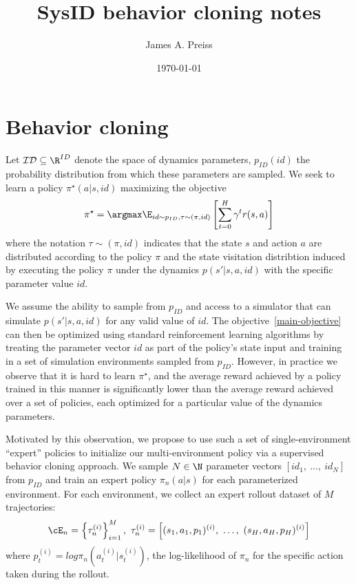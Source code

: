 \documentclass[12pt]{article}
\title{SysID behavior cloning notes}
\author{James A. Preiss}
\date{\monthyear \today}
\newcommand{\cID}{\mathcal{ID}}
\newcommand{\pibar}{\overline{\pi_\theta}}
\begin{document}
\section{Behavior cloning}
Let $\cID \subseteq \R^{ID}$ denote the space of dynamics parameters,
$p_{ID}(id)$ the probability distribution from which these parameters are sampled.
We seek to learn a policy $\pi^\star(a|s,id)$ maximizing the objective
\begin{equation}
\pi^\star = \argmax \E_{id \sim p_{ID}, \tau \sim (\pi, id)} \left[
\sum_{t=0}^H \gamma^t r(s,a)
\right]
\label{main-objective}
\end{equation}
where the notation $\tau \sim (\pi, id)$ indicates that the state $s$ and action $a$
are distributed according to the policy $\pi$ and the state visitation distribtion
induced by executing the policy $\pi$ under the dynamics $p(s'|s,a,id)$ with the specific parameter value $id$.

We assume the ability to sample from $p_{ID}$
and access to a simulator that can simulate $p(s'|s,a,id)$ for any valid value of $id$.
The objective~\eqref{main-objective} can then be optimized using standard reinforcement learning algorithms
by treating the parameter vector $id$ as part of the policy's state input
and training in a set of simulation environments sampled from $p_{ID}$.
However, in practice we observe that it is hard to learn $\pi^\star$,
and the average reward achieved by a policy trained in this manner
is significantly lower than the average reward achieved
over a set of policies, each optimized for a particular value of the dynamics parameters.

Motivated by this observation, we propose to use such a set of single-environment ``expert'' policies
to initialize our multi-environment policy via a supervised behavior cloning approach.
We sample $N \in \N$ parameter vectors $[id_1,\ \dots,\ id_N]$ from $p_{ID}$
and train an expert policy $\pi_n(a|s)$ for each parameterized environment.
For each environment, we collect an expert rollout dataset of $M$ trajectories:
\begin{equation}
\cE_n = \left\{ \tau_n^{(i)} \right\}_{i=1}^M,\ \tau_n^{(i)} = \left[(s_1, a_1, p_1)^{(i)},\ \dots,\ (s_H, a_H, p_H)^{(i)}\right]
\end{equation}
where $p_t^{(i)} = log \pi_n(a_t^{(i)}|s_t^{(i)})$, the log-likelihood of $\pi_n$ for the specific action taken during the rollout.
\end{document}
